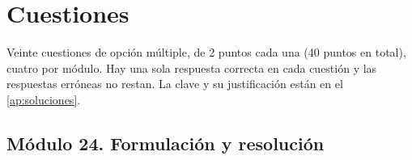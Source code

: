 \chapter{Cuestiones}
\label{cap:test}

Veinte cuestiones de opción múltiple, de 2 puntos cada una (40 puntos en total), cuatro por módulo. Hay una sola respuesta correcta en cada cuestión y las respuestas erróneas no restan. La clave y su justificación están en el \cref{ap:soluciones}.

\section*{Módulo 24. Formulación y resolución}

